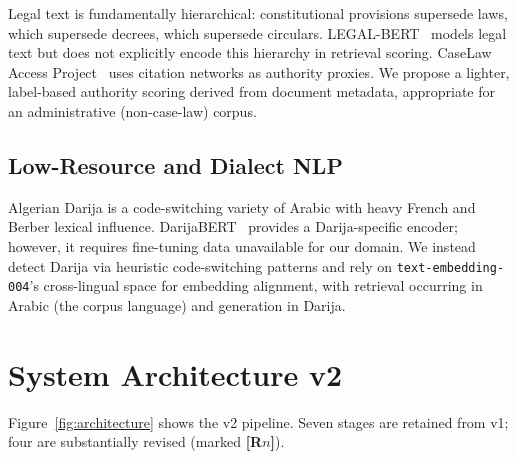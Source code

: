 \documentclass[12pt,a4paper]{article}
\begin{document}
Legal text is fundamentally hierarchical: constitutional provisions supersede
laws, which supersede decrees, which supersede circulars. LEGAL-BERT~\cite{chalkidis2020legalbert}
models legal text but does not explicitly encode this hierarchy in retrieval scoring.
CaseLaw Access Project~\cite{harvard2019caselaw} uses citation networks as
authority proxies. We propose a lighter, label-based authority scoring derived
from document metadata, appropriate for an administrative (non-case-law) corpus.

\subsection{Low-Resource and Dialect NLP}

Algerian Darija is a code-switching variety of Arabic with heavy French and
Berber lexical influence. DarijaBERT~\cite{gaanoun2023darijabert} provides
a Darija-specific encoder; however, it requires fine-tuning data unavailable for
our domain. We instead detect Darija via heuristic code-switching patterns and
rely on \texttt{text-embedding-004}'s cross-lingual space for embedding alignment,
with retrieval occurring in Arabic (the corpus language) and generation in Darija.

\section{System Architecture v2}
\label{sec:system}

Figure~\ref{fig:architecture} shows the v2 pipeline. Seven stages are retained from
v1; four are substantially revised (marked \textbf{[R$n$]}).
\end{document}
